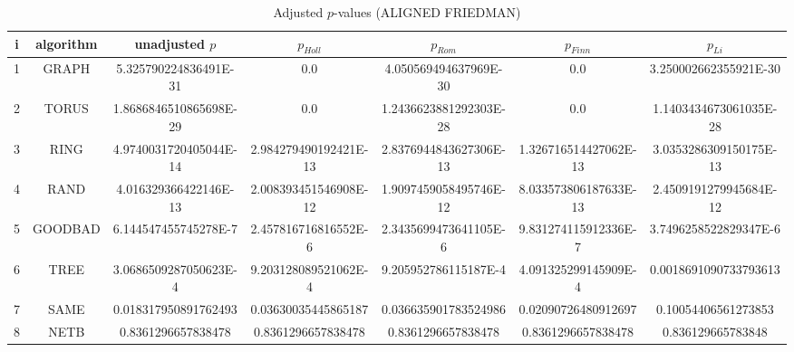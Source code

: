 \documentclass[a4paper,10pt]{article}
\begin{document}
\begin{landscape}
\begin{table}[!htp]
\centering\scriptsize
\caption{Adjusted $p$-values (ALIGNED FRIEDMAN)}
\begin{tabular}{ccccccc}
i&algorithm&unadjusted $p$&$p_{Holl}$&$p_{Rom}$&$p_{Finn}$&$p_{Li}$\\
\hline
1& GRAPH&5.325790224836491E-31&0.0&4.050569494637969E-30&0.0&3.250002662355921E-30\\
2& TORUS&1.8686846510865698E-29&0.0&1.2436623881292303E-28&0.0&1.1403434673061035E-28\\
3& RING&4.9740031720405044E-14&2.984279490192421E-13&2.8376944843627306E-13&1.326716514427062E-13&3.0353286309150175E-13\\
4& RAND&4.016329366422146E-13&2.008393451546908E-12&1.9097459058495746E-12&8.033573806187633E-13&2.4509191279945684E-12\\
5& GOODBAD&6.144547455745278E-7&2.457816716816552E-6&2.3435699473641105E-6&9.831274115912336E-7&3.7496258522829347E-6\\
6& TREE&3.0686509287050623E-4&9.203128089521062E-4&9.205952786115187E-4&4.091325299145909E-4&0.0018691090733793613\\
7& SAME&0.018317950891762493&0.03630035445865187&0.036635901783524986&0.02090726480912697&0.10054406561273853\\
8& NETB&0.8361296657838478&0.8361296657838478&0.8361296657838478&0.8361296657838478&0.836129665783848\\
\hline
\end{tabular}
\end{table}


\newpage


\end{landscape}
\end{document}
